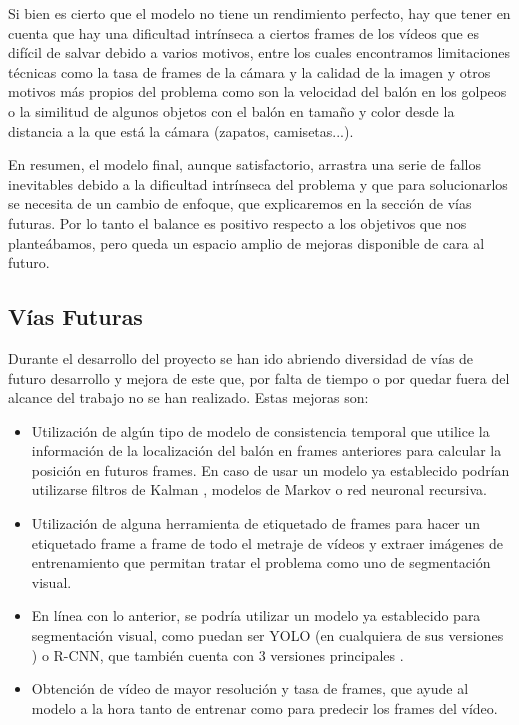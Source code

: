 Si bien es cierto que el modelo no tiene un rendimiento perfecto, hay que tener en cuenta que hay una dificultad intrínseca a ciertos frames de los vídeos que es difícil de salvar debido a varios motivos, entre los cuales encontramos limitaciones técnicas como la tasa de frames de la cámara y la calidad de la imagen y otros motivos más propios del problema como son la velocidad del balón en los golpeos o la similitud de algunos objetos con el balón en tamaño y color desde la distancia a la que está la cámara (zapatos, camisetas...).

En resumen, el modelo final, aunque satisfactorio, arrastra una serie de fallos inevitables debido a la dificultad intrínseca del problema y que para solucionarlos se necesita de un cambio de enfoque, que explicaremos en la sección de vías futuras. Por lo tanto el balance es positivo respecto a los objetivos que nos planteábamos, pero queda un espacio amplio de mejoras disponible de cara al futuro.



\subsection{Vías Futuras}

Durante el desarrollo del proyecto se han ido abriendo diversidad de vías de futuro desarrollo y mejora de este que, por falta de tiempo o por quedar fuera del alcance del trabajo no se han realizado. Estas mejoras son:

\begin{itemize}
    \item Utilización de algún tipo de modelo de consistencia temporal que utilice la información de la localización del balón en frames anteriores para calcular la posición en futuros frames. En caso de usar un modelo ya establecido podrían utilizarse filtros de Kalman \cite{Thrun:2005:PR:1121596}, modelos de Markov o red neuronal recursiva.
    \item Utilización de alguna herramienta de etiquetado de frames \cite{dutta2016via} para hacer un etiquetado frame a frame de todo el metraje de vídeos y extraer imágenes de entrenamiento que permitan tratar el problema como uno de segmentación visual.
    \item En línea con lo anterior, se podría utilizar un modelo ya establecido para segmentación visual, como puedan ser YOLO (en cualquiera de sus versiones \cite{art:yolo,art:yolo2,art:yolo3}) o R-CNN, que también cuenta con 3 versiones principales \cite{art:RCNN, art:fastRCNN, art:fasterRCNN}.
    \item Obtención de vídeo de mayor resolución y tasa de frames, que ayude al modelo a la hora tanto de entrenar como para predecir los frames del vídeo.
\end{itemize}